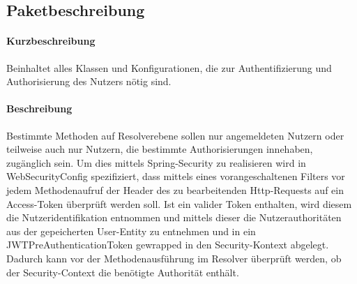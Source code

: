 \subsection{Paketbeschreibung}%
\paragraph*{Kurzbeschreibung}
Beinhaltet alles Klassen und Konfigurationen, die zur Authentifizierung und Authorisierung des Nutzers nötig sind.
\paragraph*{Beschreibung}
Bestimmte Methoden auf Resolverebene sollen nur angemeldeten Nutzern oder teilweise auch nur Nutzern, die bestimmte Authorisierungen
innehaben, zugänglich sein. Um dies mittels Spring-Security zu realisieren wird in \dq WebSecurityConfig \dq spezifiziert, dass mittels eines vorangeschaltenen Filters vor jedem
Methodenaufruf der Header des zu bearbeitenden Http-Requests auf ein Access-Token überprüft werden soll. Ist ein valider Token enthalten, 
wird diesem die Nutzeridentifikation entnommen und mittels dieser die Nutzerauthoritäten aus der gepeicherten User-Entity
zu entnehmen und in ein JWTPreAuthenticationToken gewrapped in den Security-Kontext abgelegt. Dadurch kann vor der Methodenausführung
im Resolver überprüft werden, ob der Security-Context die benötigte Authorität enthält.

